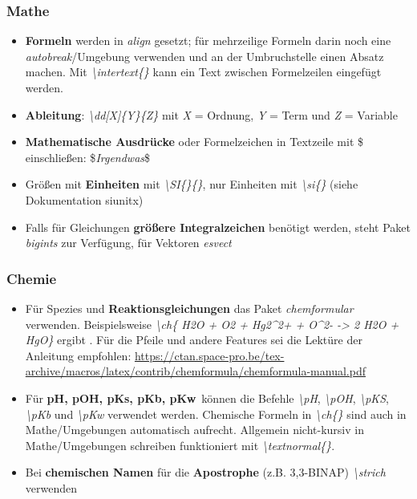 \documentclass[./main.tex]{subfiles}
\begin{document}
\subsubsection{Mathe}
\begin{itemize}
    \item \textbf{Formeln} werden in \textit{align} gesetzt; f\"ur mehrzeilige Formeln darin noch eine \textit{autobreak}\-/Umgebung verwenden und an der Umbruchstelle einen Absatz machen. Mit \textit{\hypertarget{intertext}{\textbackslash intertext\{\}}} kann ein Text zwischen Formelzeilen eingef\"ugt werden.  
    \item \textbf{Ableitung}: \textit{\hypertarget{dd}{\textbackslash dd[X]\{Y\}\{Z\}}} mit \textit{X} = Ordnung, \textit{Y} = Term und \textit{Z} = Variable  
    \item \textbf{Mathematische Ausdr\"ucke} oder Formelzeichen in Textzeile mit \$ einschlie\ss{}en:  \$\textit{Irgendwas}\$ 
    \item \hypertarget{SI}{} Gr\"o\ss{}en mit \textbf{Einheiten} mit \textit{\textbackslash SI\{\}\{\}}, nur Einheiten mit \textit{\textbackslash si\{\}} (siehe Dokumentation siunitx)
    \item Falls f\"ur Gleichungen \textbf{gr\"o\ss{}ere Integralzeichen} ben\"otigt werden, steht Paket \textit{bigints} zur Verf\"ugung, f\"ur Vektoren \textit{esvect}
\end{itemize}
\subsubsection{Chemie}
\begin{itemize}
    \item F\"ur Spezies und \textbf{Reaktionsgleichungen} das Paket \textit{chemformular} verwenden. Beispielsweise \textit{\hypertarget{ch}{\textbackslash ch}\{ H2O + O2 + Hg2\textasciicircum2+ + O\textasciicircum2- -> 2 H2O + HgO\}} ergibt . F\"ur die Pfeile und andere Features sei die Lekt\"ure der Anleitung empfohlen:  \url{https://ctan.space-pro.be/tex-archive/macros/latex/contrib/chemformula/chemformula-manual.pdf}
    \item F\"ur \textbf{pH, pOH, pKs, pKb, pKw}~k\"onnen die Befehle \hypertarget{pH}{} \hypertarget{pKs}{} \hypertarget{pKb}{} \hypertarget{pKw}{} \hypertarget{pOH}{} \textit{\textbackslash pH}, \textit{\textbackslash pOH}, \textit{\textbackslash pKS}, \textit{\textbackslash pKb} und \textit{\textbackslash pKw} verwendet werden. Chemische Formeln in \textit{\textbackslash ch\{\}} sind auch in Mathe\-/Umgebungen automatisch aufrecht. Allgemein nicht-kursiv in Mathe\-/Umgebungen schreiben funktioniert mit \textit{\textbackslash textnormal\{\}}. 
    \item Bei \textbf{chemischen Namen} f\"ur die \textbf{Apostrophe} (z.B. 3,3\strich-BINAP) \hypertarget{strich}{\textit{\textbackslash strich}} verwenden
\end{itemize}
\end{document}
